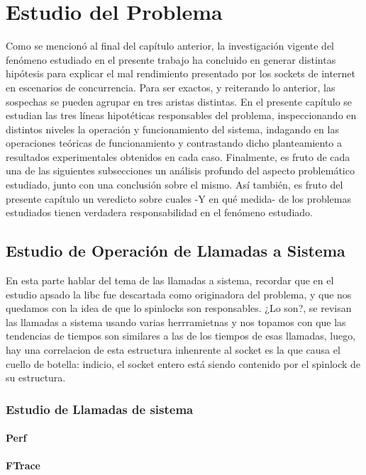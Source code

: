 \chapter{Estudio del Problema}

Como se mencionó al final del capítulo anterior, la investigación vigente del fenómeno estudiado en el presente trabajo ha concluido en generar distintas hipótesis para explicar el mal rendimiento presentado por los sockets de internet en escenarios de concurrencia. Para ser exactos, y reiterando lo anterior, las sospechas se pueden agrupar en tres aristas distintas. En el presente capítulo se estudian las tres líneas hipotéticas responsables del problema, inspeccionando en distintos niveles la operación y funcionamiento del sistema, indagando en las operaciones teóricas de funcionamiento y contrastando dicho planteamiento a resultados experimentales obtenidos en cada caso. Finalmente, es fruto de cada una de las siguientes subsecciones un análisis profundo del aspecto problemático estudiado, junto con una conclusión sobre el mismo. Así también, es fruto del presente capítulo un veredicto sobre cuales -Y en qué medida- de los problemas estudiados tienen verdadera responsabilidad en el fenómeno estudiado.

\section{Estudio de Operación de Llamadas a Sistema}
En esta parte hablar del tema de las llamadas a sistema, recordar que en el estudio apsado la libc fue descartada como originadora del problema, y que nos quedamos con la idea de que lo spinlocks son responsables. ¿Lo son?, se revisan las llamadas a sistema usando varias herrramietnas y nos topamos con que las tendencias de tiempos son similares a las de los tiempos de esas llamadas, luego, hay una correlacion de esta estructura inhenrente al socket es la que causa el cuello de botella: indicio, el socket entero está siendo contenido por el spinlock de su estructura.
\subsection{Estudio de Llamadas de sistema}
\subsubsection{Perf}
\subsubsection{FTrace}
